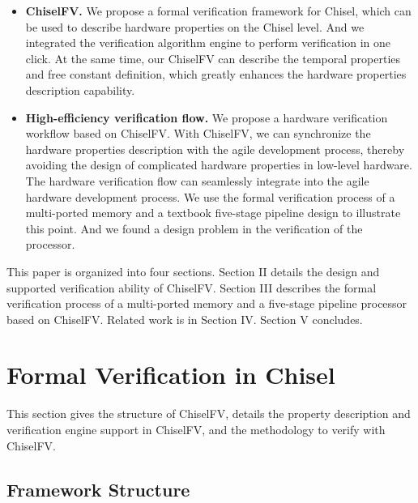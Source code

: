 \documentclass[conference]{IEEEtran}
\theoremstyle{definition}
\begin{document}
\begin{itemize}
    \item \textbf{ChiselFV.} We propose a formal verification framework for Chisel, which can be used to describe hardware properties on the Chisel level. And we integrated the verification algorithm engine to perform verification in one click. At the same time, our ChiselFV can describe the temporal properties and free constant definition, which greatly enhances the hardware properties description capability.
    \item \textbf{High-efficiency verification flow.} We propose a hardware verification workflow based on ChiselFV. With ChiselFV, we can synchronize the hardware properties description with the agile development process, thereby avoiding the design of complicated hardware properties in low-level hardware. The hardware verification flow can seamlessly integrate into the agile hardware development process. 
    We use the formal verification process of a multi-ported memory and a textbook five-stage pipeline design to illustrate this point.
    And we found a design problem in the verification of the processor.
\end{itemize}

This paper is organized into four sections. 
Section II details the design and supported verification ability of ChiselFV.
Section III describes the formal verification process of a multi-ported memory and a five-stage pipeline processor based on ChiselFV.
Related work is in Section IV. Section V concludes.

\section{Formal Verification in Chisel}

This section gives the structure of ChiselFV, details the property description and verification engine support in ChiselFV, and the methodology to verify with ChiselFV.

\subsection{Framework Structure}
\end{document}
